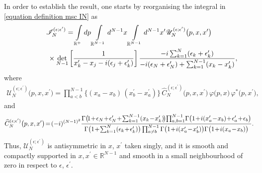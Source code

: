 \documentclass[11pt]{article}
\numberwithin{equation}{section}
\numberwithin{equation}{section}
\begin{document}
In order to establish the result, one starts by reorganising the integral in \eqref{equation definition msc IN} as
\begin{gather*}
\mathscr{I}_N^{(\epsilon;\epsilon^{\prime})} = \int\limits_{\mathbb{R}^+}{} {\rm d}p \int\limits_{\mathbb{R}^{N-1}}{}
{\rm d}^{N-1}x \int\limits_{\mathbb{R}^{N-1}}{} {\rm d}^{N-1}x^{\prime}
\mathscr{U}_N^{(\epsilon;\epsilon^{\prime})}\big(p,x,x^{\prime} \big)
 \\ \hphantom{\mathscr{I}_N^{(\epsilon;\epsilon^{\prime})} =}
\times \det_{N-1}\bigg[ \frac{1}{x^{\prime}_k-x_j-{\rm i} (\epsilon_j+\epsilon_k^{\prime}) } \bigg] \,
\frac{-{\rm i} \sum_{k=1}^{N}(\epsilon_k+\epsilon_k^{\prime}) }{-{\rm i}(\epsilon_N+\epsilon_N^{\prime}) + \sum_{k=1}^{N-1}(x_k - x_k^{\prime}) },
\end{gather*}
where
\begin{gather*}
\mathscr{U}_N^{(\epsilon;\epsilon^{\prime})}\big(p,x,x^{\prime} \big) =
 \prod\limits_{a<b}^{N-1} \big\{ (x_{a}-x_{b})\, (x_{b}^{\prime}-x_{a}^{\prime}) \big\} \,
\widehat{C}_N^{(\epsilon;\epsilon^{\prime})}\big(p,x,x^{\prime} \big) \, \varphi\big(p,x\big) \, \varphi^{*}\big(p,x^{\prime}\big) ,
\end{gather*}
and
\begin{gather*}
\widehat{C}_N^{(\epsilon;\epsilon^{\prime})}\big(p,x,x^{\prime} \big) \! =\! (-{\rm i})^{(N-1)^2}
\frac{ \Gamma\big(\! 1\!+\! \epsilon_N\!+\!\epsilon^{\prime}_N\! +\!\sum_{k=1}^{N-1}(x_k \!-\! x_k^{\prime})\! \big) \!\prod_{ a,b=1 }^{ N-1 }\!
 \Gamma\big(1\!+\!{\rm i}(x_a^{\prime}\!-\!x_b)\!+\!\epsilon'_a\!+\!\epsilon_b \big) }{
 \Gamma\big( 1\!+\! \sum_{k=1}^{N}(\epsilon_k\! +\! \epsilon_k^{\prime}) \big) \prod_{ a \not= b }^{ N-1 }
 \Gamma\big(1\!+\!{\rm i} (x_{a}^{\prime}\!-\!x_{b}^{\prime})\big) \Gamma\big( 1\!+\!{\rm i} (x_{a}\!-\!x_{b}) \big) }.
\end{gather*}
Thus, $\mathscr{U}_N^{(\epsilon;\epsilon^{\prime})}$ is antisymmetric in $x$, $x^{\prime}$ taken singly, and it is smooth and compactly
supported in $x, x^{\prime} \in \mathbb{R}^{N-1}$ and smooth in a small neighbourhood of zero in respect to $\epsilon$, $\epsilon^{\prime}$.
\end{document}
